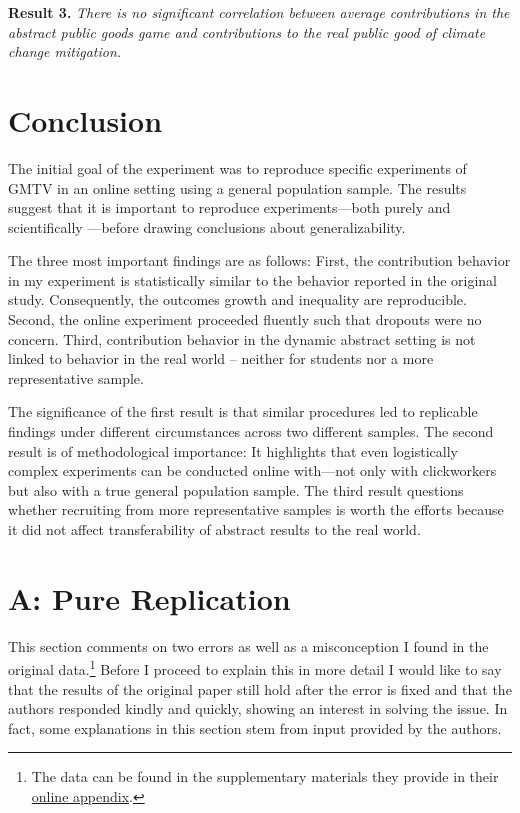 \documentclass[
  authoryear,
  preprint,
  3p]{elsarticle}
\begin{document}
\textbf{Result 3.} \emph{There is no significant correlation between
average contributions in the abstract public goods game and
contributions to the real public good of climate change mitigation.}

\hypertarget{sec-conclusion}{%
\section{Conclusion}\label{sec-conclusion}}

The initial goal of the experiment was to reproduce specific experiments
of GMTV in an online setting using a general population sample. The
results suggest that it is important to reproduce experiments---both
purely and scientifically \citep[ p.~716]{Hamermesh2007}---before
drawing conclusions about generalizability.

The three most important findings are as follows: First, the
contribution behavior in my experiment is statistically similar to the
behavior reported in the original study. Consequently, the outcomes
growth and inequality are reproducible. Second, the online experiment
proceeded fluently such that dropouts were no concern. Third,
contribution behavior in the dynamic abstract setting is not linked to
behavior in the real world -- neither for students nor a more
representative sample.

The significance of the first result is that similar procedures led to
replicable findings under different circumstances across two different
samples. The second result is of methodological importance: It
highlights that even logistically complex experiments can be conducted
online with---not only with clickworkers but also with a true general
population sample. The third result questions whether recruiting from
more representative samples is worth the efforts because it did not
affect transferability of abstract results to the real world.

\newpage{}

\hypertarget{a-pure-replication}{%
\section{A: Pure Replication}\label{a-pure-replication}}

This section comments on two errors as well as a misconception I found
in the original data.\footnote{The data can be found in the
  supplementary materials they provide in their
  \href{https://www.sciencedirect.com/science/article/pii/S0047272717300361\#s0115}{online
  appendix}.} Before I proceed to explain this in more detail I would
like to say that the results of the original paper still hold after the
error is fixed and that the authors responded kindly and quickly,
showing an interest in solving the issue. In fact, some explanations in
this section stem from input provided by the authors.
\end{document}
